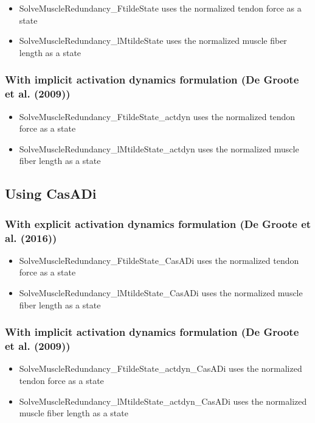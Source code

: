 \documentclass[a4paper,oneside,11pt]{article}
\begin{document}
\begin{itemize}
\item SolveMuscleRedundancy_FtildeState uses the normalized tendon force as a state
\item SolveMuscleRedundancy_lMtildeState uses the normalized muscle fiber length as a state
\end{itemize}

\subsubsection{With implicit activation dynamics formulation (De Groote et al. (2009))}

\begin{itemize}
\item SolveMuscleRedundancy_FtildeState_actdyn uses the normalized tendon force as a state
\item SolveMuscleRedundancy_lMtildeState_actdyn uses the normalized muscle fiber length as a state
\end{itemize}

\subsection{Using CasADi}

\subsubsection{With explicit activation dynamics formulation (De Groote et al. (2016))}

\begin{itemize}
\item SolveMuscleRedundancy_FtildeState_CasADi uses the normalized tendon force as a state
\item SolveMuscleRedundancy_lMtildeState_CasADi uses the normalized muscle fiber length as a state
\end{itemize}

\subsubsection{With implicit activation dynamics formulation (De Groote et al. (2009))}

\begin{itemize}
\item SolveMuscleRedundancy_FtildeState_actdyn_CasADi uses the normalized tendon force as a state
\item SolveMuscleRedundancy_lMtildeState_actdyn_CasADi uses the normalized muscle fiber length as a state
\end{itemize}
\end{document}
